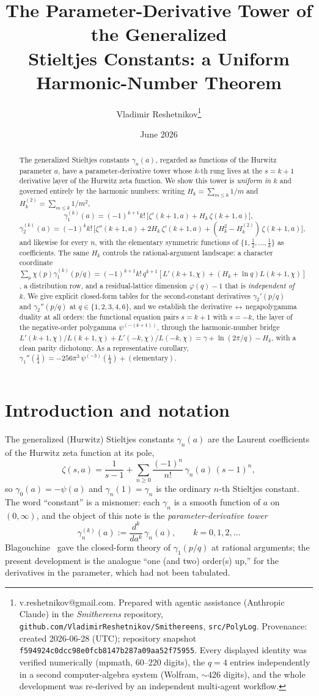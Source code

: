 \documentclass[11pt]{article}
\title{The Parameter-Derivative Tower of the Generalized\\
Stieltjes Constants: a Uniform Harmonic-Number Theorem}
\author{Vladimir Reshetnikov\thanks{%
v.reshetnikov@gmail.com. Prepared with agentic assistance (Anthropic Claude) in
the \emph{Smithereens} repository,
\texttt{github.com/VladimirReshetnikov/Smithereens}, \texttt{src/PolyLog}.
Provenance: created 2026-06-28 (UTC); repository snapshot
\texttt{f594924c0dcc98e0fcb8147b287a09aa52f75955}. Every displayed identity was
verified numerically (mpmath, \(60\)--\(220\) digits), the \(q=4\) entries
independently in a second computer-algebra system (Wolfram, \(\sim426\)
digits), and the whole development was re-derived by an independent multi-agent
workflow.}}
\date{June 2026}
\theoremstyle{remark}
\newcommand{\h}[1]{H_{#1}}
\begin{document}
\maketitle

\begin{abstract}
The generalized Stieltjes constants $\gamma_n(a)$, regarded as functions of the
Hurwitz parameter $a$, have a parameter-derivative tower whose $k$-th rung lives
at the $s=k+1$ derivative layer of the Hurwitz zeta function. We show this tower
is \emph{uniform in $k$} and governed entirely by the harmonic numbers: writing
$\h{k}=\sum_{m\le k}1/m$ and $\h{k}^{(2)}=\sum_{m\le k}1/m^2$,
\[
  \gamma_1^{(k)}(a)=(-1)^{k+1}k!\,\bigl[\zeta'(k{+}1,a)+\h{k}\,\zeta(k{+}1,a)\bigr],
\]
\[
  \gamma_2^{(k)}(a)=(-1)^{k}k!\,\bigl[\zeta''(k{+}1,a)+2\h{k}\,\zeta'(k{+}1,a)
   +(\h{k}^2-\h{k}^{(2)})\,\zeta(k{+}1,a)\bigr],
\]
and likewise for every $n$, with the elementary symmetric functions of
$\{1,\tfrac12,\dots,\tfrac1k\}$ as coefficients. The same $\h{k}$ controls the
rational-argument landscape: a character coordinate
$\sum_p\chi(p)\gamma_1^{(k)}(p/q)=(-1)^{k+1}k!\,q^{k+1}[L'(k{+}1,\chi)+(\h{k}+\ln
q)L(k{+}1,\chi)]$, a distribution row, and a residual-lattice dimension
$\varphi(q)-1$ that is \emph{independent of $k$}. We give explicit closed-form
tables for the second-constant derivatives $\gamma_2'(p/q)$ and
$\gamma_2''(p/q)$ at $q\in\{1,2,3,4,6\}$, and we establish the
derivative\,$\leftrightarrow$\,negapolygamma duality at all orders: the
functional equation pairs $s=k+1$ with $s=-k$, the layer of the negative-order
polygamma $\psi^{(-(k+1))}$, through the harmonic-number bridge
$L'(k{+}1,\chi)/L(k{+}1,\chi)+\overline{L'(-k,\chi)/L(-k,\chi)}=\gamma+\ln(2\pi/q)-\h{k}$,
with a clean parity dichotomy. As a representative corollary,
$\gamma_1''(\tfrac14)=-256\pi^3\,\psi^{(-3)}(\tfrac14)+(\text{elementary})$.
\end{abstract}

\section{Introduction and notation}\label{sec:intro}

The generalized (Hurwitz) Stieltjes constants $\gamma_n(a)$ are the Laurent
coefficients of the Hurwitz zeta function at its pole,
\begin{equation}\label{eq:laurent}
  \zeta(s,a)=\frac{1}{s-1}+\sum_{n\ge0}\frac{(-1)^n}{n!}\,\gamma_n(a)\,(s-1)^n ,
\end{equation}
so $\gamma_0(a)=-\psi(a)$ and $\gamma_n(1)=\gamma_n$ is the ordinary $n$-th
Stieltjes constant. The word ``constant'' is a misnomer: each $\gamma_n$ is a
smooth function of $a$ on $(0,\infty)$, and the object of this note is the
\emph{parameter-derivative tower}
\[
  \gamma_n^{(k)}(a):=\frac{d^k}{da^k}\,\gamma_n(a),\qquad k=0,1,2,\dots
\]
Blagouchine~\cite{Blagouchine2015} gave the closed-form theory of $\gamma_1(p/q)$
at rational arguments; the present development is the analogue ``one (and two)
order(s) up,'' for the derivatives in the parameter, which had not been
tabulated.
\end{document}
